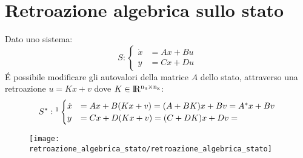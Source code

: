 \documentclass[../main.tex]{subfiles}
\begin{document}
	\section{Retroazione algebrica sullo stato}
		Dato uno sistema:
		\[
			S: 
			\begin{cases}
				\dot x &= Ax + Bu\\
				y &= Cx + Du
			\end{cases}
		\]
		\'E possibile modificare gli autovalori della matrice $ A $ dello stato, attraverso una retroazione $ u = Kx + v $ dove $ K \in \rm I\!R^{n_u \times n_x} $:
		\[
			S^{*}: \footnotemark
			\begin{cases}
				\dot x &= Ax + B(Kx+v) = (A+BK)x + Bv = A^{*}x + Bv\\
				y &= Cx +D(Kx+v) = (C+DK)x + Dv = 
			\end{cases}
		\]
		
		\begin{figure}[H]
			\centering\texttt{[image: retroazione\_algebrica\_stato/retroazione\_algebrica\_stato]}
		\end{figure}
		
\end{document}
